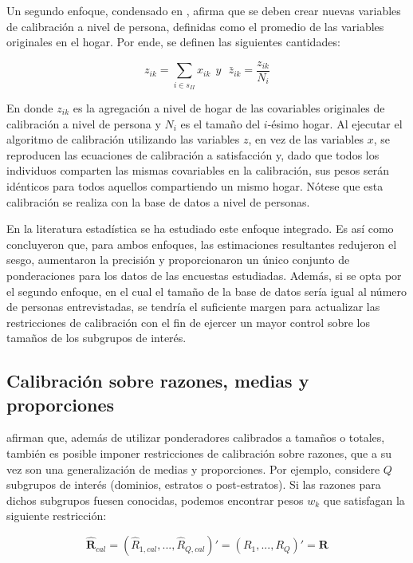 \documentclass[
  12pt,
]{book}
\begin{document}
Un segundo enfoque, condensado en \citet{Lemaitre_Dufour_1987}, afirma que se deben crear nuevas variables de calibración a nivel de persona, definidas como el promedio de las variables originales en el hogar. Por ende, se definen las siguientes cantidades:

\[
z_{ik}=\sum_{i \in s_{II}} x_{ik}\ \ y\ \ \ {\bar{z}}_{ik}=\frac{z_{ik}}{N_i}
\]

En donde \(z_{ik}\) es la agregación a nivel de hogar de las covariables originales de calibración a nivel de persona y \(N_i\) es el tamaño del \(i\)-ésimo hogar. Al ejecutar el algoritmo de calibración utilizando las variables \(z\), en vez de las variables \(x\), se reproducen las ecuaciones de calibración a satisfacción y, dado que todos los individuos comparten las mismas covariables en la calibración, sus pesos serán idénticos para todos aquellos compartiendo un mismo hogar. Nótese que esta calibración se realiza con la base de datos a nivel de personas.

En la literatura estadística se ha estudiado este enfoque integrado. Es así como \citet{Neethling_Galpin_2006} concluyeron que, para ambos enfoques, las estimaciones resultantes redujeron el sesgo, aumentaron la precisión y proporcionaron un único conjunto de ponderaciones para los datos de las encuestas estudiadas. Además, si se opta por el segundo enfoque, en el cual el tamaño de la base de datos sería igual al número de personas entrevistadas, se tendría el suficiente margen para actualizar las restricciones de calibración con el fin de ejercer un mayor control sobre los tamaños de los subgrupos de interés.

\hypertarget{calibraciuxf3n-sobre-razones-medias-y-proporciones}{%
\subsection{Calibración sobre razones, medias y proporciones}\label{calibraciuxf3n-sobre-razones-medias-y-proporciones}}

\citet{Gutierrez_Zhang_Rodriguez_2016} afirman que, además de utilizar ponderadores calibrados a tamaños o totales, también es posible imponer restricciones de calibración sobre razones, que a su vez son una generalización de medias y proporciones. Por ejemplo, considere \(Q\) subgrupos de interés (dominios, estratos o post-estratos). Si las razones para dichos subgrupos fuesen conocidas, podemos encontrar pesos \(w_k\) que satisfagan la siguiente restricción:

\[
\hat{\textbf{R}}_{cal} = (\hat{R}_{1,cal},...,\hat{R}_{Q,cal})'= (R_1,...,R_Q)'= \textbf{R}
\]
\end{document}
